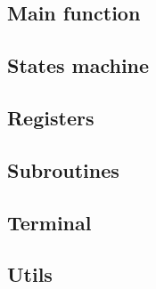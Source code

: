 
\subsection{ Main function }
    

\subsection{ States machine }
    
    
        
\subsection{ Registers }
    
    

\subsection{ Subroutines }
    
    

\subsection{ Terminal }
    
%    

\subsection{ Utils }
    
    

